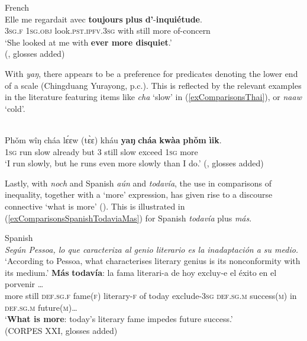 {\begin{exe}
	\ex French\label{exComparisonsToujours}\\
	\gll Elle me regardait avec \textbf{toujours} \textbf{plus} \textbf{d'}-\textbf{inquiétude}.\\
	3\textsc{sg}.\textsc{f} 1\textsc{sg}.\textsc{obj} look.\textsc{pst}.\textsc{ipfv}.3\textsc{sg} with still more of-concern\\
	\glt \lq She looked at me with \textbf{ever more disquiet}.\rq{}
	\\(\cite[164]{MosegaardHansen2008}, glosses added)
\end{exe}

With  \textit{yaŋ}, there appears to be a preference for predicates denoting the lower end of a scale (Chingduang Yurayong, p.c.). This is reflected by the relevant examples in the literature featuring items like \textit{cha} \lq slow' in (\ref{exComparisonsThai}), or \textit{naaw} \lq cold\rq{}.

\begin{exe}
	\ex {}\label{exComparisonsThai}\\
	\gll Phǒm	wîŋ	cháa	lɛ́ɛw		\textup{(}tɛ̀ɛ\textup{)}	kháu	\textbf{yaŋ}	\textbf{cháa}	\textbf{kwàa}		\textbf{phǒm}		\textbf{ìik}.\\
1\textsc{sg} run slow already \phantom{(}but 3 still slow exceed 1\textsc{sg} more\\
	\glt \lq I run slowly, but he runs even more slowly than I do.' (\cite[240]{HigbieThinsan2002}, glosses added)
\end{exe}

Lastly, with  \textit{noch} and Spanish \textit{aún} and \textit{todavía}, the use in comparisons of inequality, together with a \lq more\rq{ }expression, has given rise to a discourse connective \lq what is more\rq{ }(). This is illustrated in (\ref{exComparisonsSpanishTodaviaMas}) for Spanish \textit{todavía} plus \textit{más}.

\begin{exe}
	\ex Spanish\label{exComparisonsSpanishTodaviaMas}\\
	\textit{Según Pessoa, lo que caracteriza al genio literario es la inadaptación a su medio.}\\
	\lq According to Pessoa, what characterises literary genius is its nonconformity with its medium.'
	\exi{}\gll  \textbf{Más} \textbf{todavía}: la fama literari-a de hoy excluy-e el éxito en el porvenir …\\
	more still \textsc{def}.\textsc{sg}.\textsc{f} fame(\textsc{f}) literary-\textsc{f} of today exclude-3\textsc{sg} \textsc{def}.\textsc{sg}.\textsc{m} success(\textsc{m}) in \textsc{def}.\textsc{sg}.\textsc{m} future(\textsc{m})…\\
	\glt \lq \textbf{What is more}: today's literary fame impedes future success.'
	\\(CORPES XXI, glosses added)
\end{exe}

}
